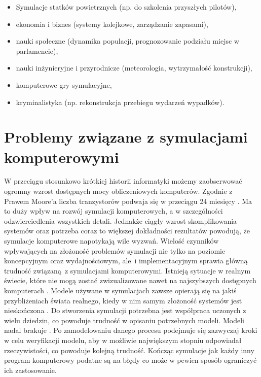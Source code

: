 \begin{itemize}
\item Symulacje statków powietrznych (np. do szkolenia przyszłych pilotów),
\item ekonomia i biznes (systemy kolejkowe, zarządzanie zapasami),
\item nauki społeczne (dynamika populacji, prognozowanie podziału miejsc w parlamencie),
\item nauki inżynieryjne i przyrodnicze (meteorologia, wytrzymałość konstrukcji),
\item komputerowe gry symulacyjne,
\item kryminalistyka (np. rekonstrukcja przebiegu wydarzeń wypadków).
\end{itemize}

\section{Problemy związane z symulacjami komputerowymi}
\label{sec:ProblemyzSymulacjami}

W przeciągu stosunkowo krótkiej historii informatyki możemy zaobserwować ogromny wzrost dostępnych mocy obliczeniowych komputerów. Zgodnie z Prawem Moore'a liczba tranzystorów podwaja się w przeciągu 24 miesięcy \cite{mooreslaw}. Ma to duży wpływ na rozwój symulacji komputerowych, a w szczególności odzwierciedlenia wszystkich detali. Jednakże ciągły wzrost skomplikowania systemów oraz potrzeba coraz to większej dokładności rezultatów powodują, że symulacje komputerowe napotykają wile wyzwań. Wielość czynników wpływających na złożoność problemów symulacji nie tylko na poziomie koncepcyjnym oraz wydajnościowym, ale~i implementacyjnym sprawia główną trudność związaną~z symulacjami komputerowymi. Istnieją sytuacje w realnym świecie, które nie mogą zostać zwizualizowane nawet na najszybszych dostępnych komputerach \cite{simulationLimits}. Modele używane w symulacjach zawsze opierają się na jakiś przybliżeniach świata realnego, kiedy w nim samym złożoność systemów jest nieskończona \cite{simulationInGeneral}. Do stworzenia symulacji potrzebna jest współpraca uczonych z wielu dziedzin, co powoduje trudność w opisaniu potrzebnych modeli. Modeli nadal brakuje \cite{simulationChallenges}. Po zamodelowaniu danego procesu podejmuje się zazwyczaj kroki w celu weryfikacji modelu, aby w możliwie największym stopniu odpowiadał rzeczywistości, co powoduje kolejną trudność. Kończąc symulacje jak każdy inny program komputerowy podatne są na błędy co może w pewien sposób ograniczyć ich zastosowanie.
















